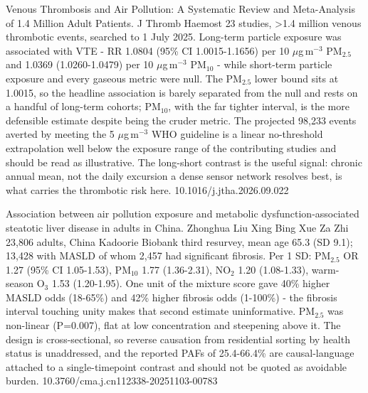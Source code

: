 \documentclass[10pt]{article}
\begin{document}

{Venous Thrombosis and Air Pollution: A Systematic Review and Meta-Analysis of 1.4 Million Adult Patients.}
{J Thromb Haemost}
{23 studies, >1.4 million venous thrombotic events, searched to 1 July 2025. Long-term particle exposure was associated with VTE - RR 1.0804 (95\% CI 1.0015-1.1656) per 10 $\mu$g\,m$^{-3}$ PM$_{2.5}$ and 1.0369 (1.0260-1.0479) per 10 $\mu$g\,m$^{-3}$ PM$_{10}$ - while short-term particle exposure and every gaseous metric were null. The PM$_{2.5}$ lower bound sits at 1.0015, so the headline association is barely separated from the null and rests on a handful of long-term cohorts; PM$_{10}$, with the far tighter interval, is the more defensible estimate despite being the cruder metric. The projected 98,233 events averted by meeting the 5 $\mu$g\,m$^{-3}$ WHO guideline is a linear no-threshold extrapolation well below the exposure range of the contributing studies and should be read as illustrative. The long-short contrast is the useful signal: chronic annual mean, not the daily excursion a dense sensor network resolves best, is what carries the thrombotic risk here.}
{10.1016/j.jtha.2026.09.022}

{Association between air pollution exposure and metabolic dysfunction-associated steatotic liver disease in adults in China.}
{Zhonghua Liu Xing Bing Xue Za Zhi}
{23,806 adults, China Kadoorie Biobank third resurvey, mean age 65.3 (SD 9.1); 13,428 with MASLD of whom 2,457 had significant fibrosis. Per 1 SD: PM$_{2.5}$ OR 1.27 (95\% CI 1.05-1.53), PM$_{10}$ 1.77 (1.36-2.31), NO$_2$ 1.20 (1.08-1.33), warm-season O$_3$ 1.53 (1.20-1.95). One unit of the mixture score gave 40\% higher MASLD odds (18-65\%) and 42\% higher fibrosis odds (1-100\%) - the fibrosis interval touching unity makes that second estimate uninformative. PM$_{2.5}$ was non-linear (P=0.007), flat at low concentration and steepening above it. The design is cross-sectional, so reverse causation from residential sorting by health status is unaddressed, and the reported PAFs of 25.4-66.4\% are causal-language attached to a single-timepoint contrast and should not be quoted as avoidable burden.}
{10.3760/cma.j.cn112338-20251103-00783}
\end{document}

